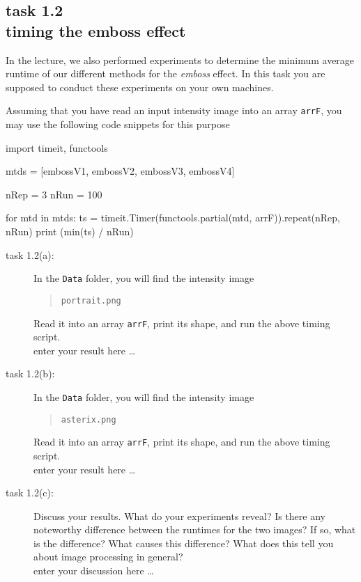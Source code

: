 
\subsection*{task 1.2 \\[1ex] timing the emboss effect}

In the lecture, we also performed experiments to determine the minimum average runtime of our different methods for the \emph{emboss} effect. In this task you are supposed to conduct these experiments on your own machines.

Assuming that you have read an input intensity image into an array \texttt{arrF}, you may use the following code snippets for this purpose
\begin{python}
import timeit, functools


mtds = [embossV1, embossV2, embossV3, embossV4]

nRep =   3
nRun = 100
    
for mtd in mtds:
	ts = timeit.Timer(functools.partial(mtd, arrF)).repeat(nRep, nRun)
	print (min(ts) / nRun)
\end{python}



\begin{description}
\item[task 1.2(a):] In the \texttt{Data} folder, you will find the intensity image
\begin{quote}
    \texttt{portrait.png}
\end{quote}
Read it into an array \texttt{arrF}, print its shape, and run the above timing script.
\color{blue} \\[1ex]
enter your result here \ldots
\color{black}

\item[task 1.2(b):] In the \texttt{Data} folder, you will find the intensity image
\begin{quote}
    \texttt{asterix.png}
\end{quote}
Read it into an array \texttt{arrF}, print its shape, and run the above timing script.
\color{blue} \\[1ex]
enter your result here \ldots
\color{black}

\newpage
\item[task 1.2(c):] Discuss your results. What do your experiments reveal? Is there any noteworthy difference between the runtimes for the two images? If so, what is the difference? What causes this difference? What does this tell you about image processing in general?
\color{blue} \\[1ex]
enter your discussion here \ldots
\color{black}
\end{description}



